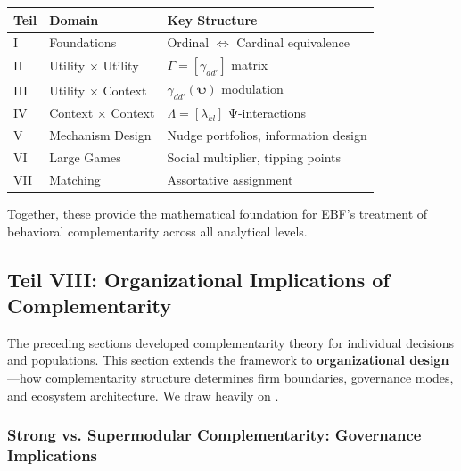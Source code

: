 \begin{center}
\begin{tabular}{lll}
\toprule
\textbf{Teil} & \textbf{Domain} & \textbf{Key Structure} \\
\midrule
I & Foundations & Ordinal $\Leftrightarrow$ Cardinal equivalence \\
II & Utility × Utility & $\Gamma = [\gamma_{dd'}]$ matrix \\
III & Utility × Context & $\gamma_{dd'}(\boldsymbol{\psi})$ modulation \\
IV & Context × Context & $\Lambda = [\lambda_{kl}]$ Ψ-interactions \\
V & Mechanism Design & Nudge portfolios, information design \\
VI & Large Games & Social multiplier, tipping points \\
VII & Matching & Assortative assignment \\
\bottomrule
\end{tabular}
\end{center}

Together, these provide the mathematical foundation for EBF's treatment of 
behavioral complementarity across all analytical levels.




\subsection{Teil VIII: Organizational Implications of Complementarity}
\label{sec:organizational}

The preceding sections developed complementarity theory for individual decisions 
and populations. This section extends the framework to \textbf{organizational design}---how 
complementarity structure determines firm boundaries, governance modes, and ecosystem 
architecture. We draw heavily on \citet{baldwin2024design}.

\subsubsection{Strong vs. Supermodular Complementarity: Governance Implications}


